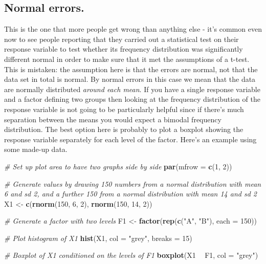 \documentclass[
]{book}
\newenvironment{Shaded}{\begin{snugshade}}{\end{snugshade}}
\newcommand{\CommentTok}[1]{\textcolor[rgb]{0.56,0.35,0.01}{\textit{#1}}}
\newcommand{\DataTypeTok}[1]{\textcolor[rgb]{0.13,0.29,0.53}{#1}}
\newcommand{\DecValTok}[1]{\textcolor[rgb]{0.00,0.00,0.81}{#1}}
\newcommand{\KeywordTok}[1]{\textcolor[rgb]{0.13,0.29,0.53}{\textbf{#1}}}
\newcommand{\NormalTok}[1]{#1}
\newcommand{\OperatorTok}[1]{\textcolor[rgb]{0.81,0.36,0.00}{\textbf{#1}}}
\newcommand{\StringTok}[1]{\textcolor[rgb]{0.31,0.60,0.02}{#1}}
\begin{document}
\hypertarget{normal-errors.}{%
\subsection{Normal errors.}\label{normal-errors.}}

This is the one that more people get wrong than anything else - it's common even now to see people reporting that they carried out a statistical test on their response variable to test whether its frequency distribution was significantly different normal in order to make sure that it met the assumptions of a t-test. This is mistaken: the assumption here is that the errors are normal, not that the data set in total is normal. By normal errors in this case we mean that the data are normally distributed \emph{around each mean}. If you have a single response variable and a factor defining two groups then looking at the frequency distribution of the response variable is not going to be particularly helpful since if there's much separation between the means you would expect a bimodal frequency distribution. The best option here is probably to plot a boxplot showing the response variable separately for each level of the factor. Here's an example using some made-up data.

\begin{Shaded}
\begin{Highlighting}[]

\CommentTok{# Set up plot area to have two graphs side by side}
\KeywordTok{par}\NormalTok{(}\DataTypeTok{mfrow =} \KeywordTok{c}\NormalTok{(}\DecValTok{1}\NormalTok{, }\DecValTok{2}\NormalTok{))}

\CommentTok{# Generate values by drawing 150 numbers from a normal distribution with mean 6 and sd 2, and a further 150 from a normal distribution with mean 14 and sd 2}
\NormalTok{X1 <-}\StringTok{ }\KeywordTok{c}\NormalTok{(}\KeywordTok{rnorm}\NormalTok{(}\DecValTok{150}\NormalTok{, }\DecValTok{6}\NormalTok{, }\DecValTok{2}\NormalTok{), }\KeywordTok{rnorm}\NormalTok{(}\DecValTok{150}\NormalTok{, }\DecValTok{14}\NormalTok{, }\DecValTok{2}\NormalTok{))}

\CommentTok{# Generate a factor with two levels}
\NormalTok{F1 <-}\StringTok{ }\KeywordTok{factor}\NormalTok{(}\KeywordTok{rep}\NormalTok{(}\KeywordTok{c}\NormalTok{(}\StringTok{"A"}\NormalTok{, }\StringTok{"B"}\NormalTok{), }\DataTypeTok{each =} \DecValTok{150}\NormalTok{))}

\CommentTok{# Plot histogram of X1}
\KeywordTok{hist}\NormalTok{(X1, }\DataTypeTok{col =} \StringTok{"grey"}\NormalTok{, }\DataTypeTok{breaks =} \DecValTok{15}\NormalTok{)}

\CommentTok{# Boxplot of X1 conditioned on the levels of F1}
\KeywordTok{boxplot}\NormalTok{(X1 }\OperatorTok{~}\StringTok{ }\NormalTok{F1, }\DataTypeTok{col =} \StringTok{"grey"}\NormalTok{)}
\end{Highlighting}
\end{Shaded}
\end{document}
